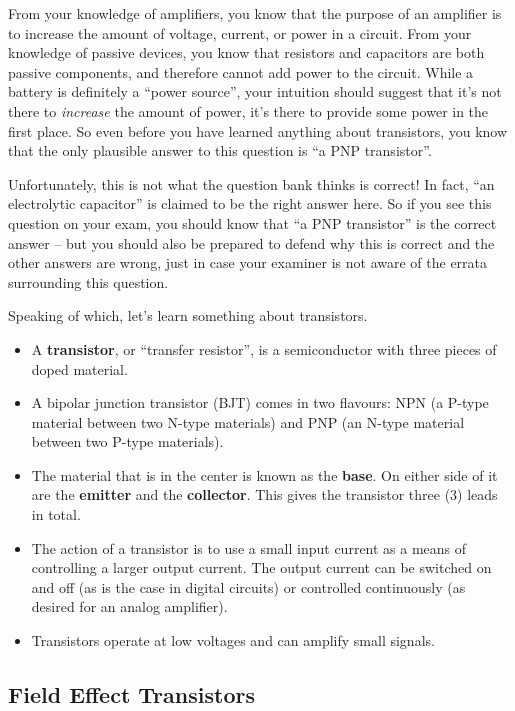 \documentclass[letterpaper,12pt]{scrartcl}
\begin{document}
From your knowledge of amplifiers, you know that the purpose of an amplifier is to increase the amount of voltage, current, or power in a circuit.
From your knowledge of passive devices, you know that resistors and capacitors are both passive components,
and therefore cannot add power to the circuit. While a battery is definitely a ``power source'', your intuition should suggest that
it's not there to \textit{increase} the amount of power, it's there to provide some power in the first place.
So even before you have learned anything about transistors, you know that the only plausible answer to this question is ``a PNP transistor''.

Unfortunately, this is not what the question bank thinks is correct! In fact, ``an electrolytic capacitor'' is claimed to be the right answer here.
So if you see this question on your exam, you should know that ``a PNP transistor'' is the correct answer -- but you should also be prepared to defend
why this is correct and the other answers are wrong, just in case your examiner is not aware of the errata surrounding this question.

Speaking of which, let's learn something about transistors.

\begin{itemize}
\item A \textbf{transistor}, or ``transfer resistor'', is a semiconductor with three pieces of doped material.
\item A bipolar junction transistor (BJT) comes in two flavours: NPN (a P-type material between two N-type materials)
and PNP (an N-type material between two P-type materials).
\item The material that is in the center is known as the \textbf{base}. On either side of it are the \textbf{emitter} and the \textbf{collector}.
This gives the transistor three (3) leads in total.
\item The action of a transistor is to use a small input current as a means of controlling a larger output current. The output current can be switched on and off
(as is the case in digital circuits) or controlled continuously (as desired for an analog amplifier).
\item Transistors operate at low voltages and can amplify small signals.
\end{itemize}

\subsection{Field Effect Transistors}
\end{document}

